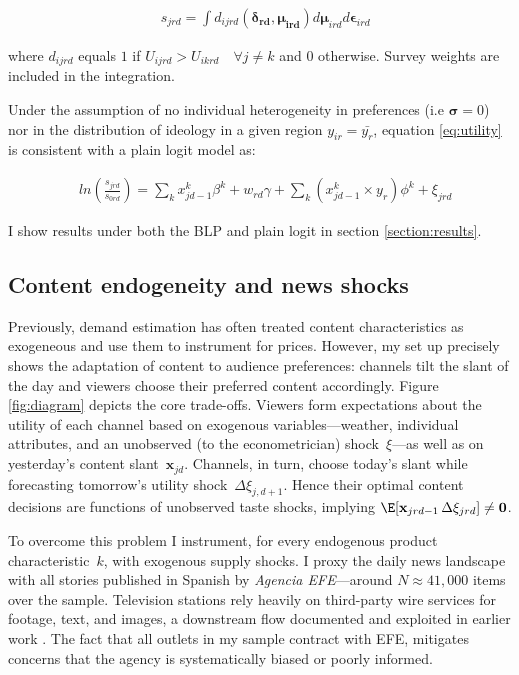 \documentclass[12pt]{article}
\begin{document}
	
	\begin{equation}\label{eq:shares}
	\begin{aligned}
		& s_{jrd} = \int d_{ijrd}(\bm{\delta_{rd}},\bm{\mu_{ird}})d\bm{\mu}_{ird}d\bm{\epsilon}_{ird}
	\end{aligned} 
\end{equation} 
	
	where $d_{ijrd}$ equals $1$ if $U_{ijrd}>U_{ikrd} \quad \forall j\neq k$ and $0$ otherwise. Survey weights are included in the integration. 

Under the assumption of no individual heterogeneity in preferences  (i.e $\bm{\sigma}=0$) nor in  the distribution of ideology in a given region $y_{ir}= \bar{y_r}$,  equation \ref{eq:utility} is consistent with a plain logit model as:


\begin{equation}\label{eq:logit}
	\begin{aligned}
		& ln \left(\frac{s_{jrd}}{s_{0rd}}\right)= \sum_k x_{jd-1}^k\beta^k+w_{rd}   \gamma  +\sum_k \left(x_{jd-1}^k\times y_r \right) \phi^k +  \xi_{jrd}
	\end{aligned} 
\end{equation} 


I show results under both the BLP and plain logit in  section \ref{section:results}. 
	
	\subsection{Content endogeneity and news shocks} \label{section:endogeneity}
	
	
Previously, demand estimation has often treated content characteristics as exogeneous and use them to instrument for prices. However, my set up precisely shows the adaptation of content to audience preferences: channels tilt the slant of the day and viewers choose their preferred content accordingly. 
	Figure \ref{fig:diagram} depicts the core trade-offs. Viewers form expectations about the utility of each channel based on exogenous variables—weather, individual attributes, and an unobserved (to the econometrician) shock~$\xi$—as well as on yesterday’s content slant~$\bm{x}_{jd}$.  
	Channels, in turn, choose today’s slant while forecasting tomorrow’s utility shock~$\Delta\xi_{j,d+1}$.  
	Hence their optimal content decisions are functions of unobserved taste shocks, implying $\E[\mathbf{x}_{jrd-1}\,\Delta\xi_{jrd}] \neq \mathbf{0}$.
	
	To overcome this problem I instrument, for every endogenous product characteristic~$k$, with exogenous supply shocks.  
	I proxy the daily news landscape with all stories published in Spanish by \emph{Agencia EFE}—around $N\!\approx\!41{,}000$ items over the sample.  
	Television stations rely heavily on third-party wire services for footage, text, and images, a downstream flow documented and exploited in earlier work \citep{milena}.  The fact that all outlets in my sample contract with EFE, mitigates concerns that the agency is systematically biased or poorly informed. 
	
\end{document}
